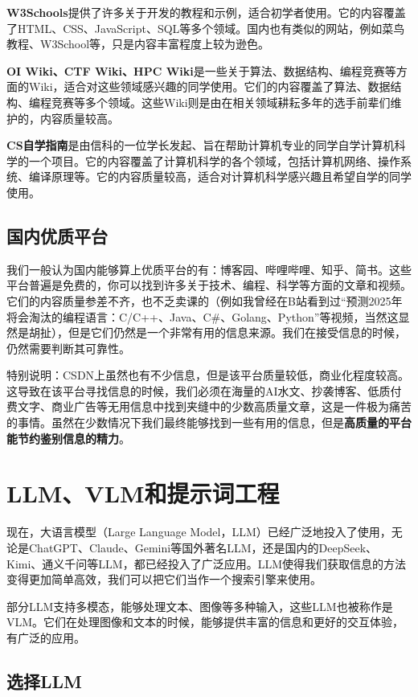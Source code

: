 \documentclass[../main.tex]{subfiles}
\begin{document}
\textbf{W3Schools}提供了许多关于开发的教程和示例，适合初学者使用。它的内容覆盖了HTML、CSS、JavaScript、SQL等多个领域。国内也有类似的网站，例如菜鸟教程、W3School等，只是内容丰富程度上较为逊色。

\textbf{OI Wiki、CTF Wiki、HPC Wiki}是一些关于算法、数据结构、编程竞赛等方面的Wiki，适合对这些领域感兴趣的同学使用。它们的内容覆盖了算法、数据结构、编程竞赛等多个领域。这些Wiki则是由在相关领域耕耘多年的选手前辈们维护的，内容质量较高。

\textbf{CS自学指南}是由信科的一位学长发起、旨在帮助计算机专业的同学自学计算机科学的一个项目。它的内容覆盖了计算机科学的各个领域，包括计算机网络、操作系统、编译原理等。它的内容质量较高，适合对计算机科学感兴趣且希望自学的同学使用。

\subsection{国内优质平台}

我们一般认为国内能够算上优质平台的有：博客园、哔哩哔哩、知乎、简书。这些平台普遍是免费的，你可以找到许多关于技术、编程、科学等方面的文章和视频。它们的内容质量参差不齐，也不乏卖课的（例如我曾经在B站看到过“预测2025年将会淘汰的编程语言：C/C++、Java、C\#、Golang、Python”等视频，当然这显然是胡扯），但是它们仍然是一个非常有用的信息来源。我们在接受信息的时候，仍然需要判断其可靠性。

特别说明：CSDN上虽然也有不少信息，但是该平台质量较低，商业化程度较高。这导致在该平台寻找信息的时候，我们必须在海量的AI水文、抄袭博客、低质付费文字、商业广告等无用信息中找到夹缝中的少数高质量文章，这是一件极为痛苦的事情。虽然在少数情况下我们最终能够找到一些有用的信息，但是\textbf{高质量的平台能节约鉴别信息的精力}。

\section{LLM、VLM和提示词工程}

现在，大语言模型（Large Language Model，LLM）已经广泛地投入了使用，无论是ChatGPT、Claude、Gemini等国外著名LLM，还是国内的DeepSeek、Kimi、通义千问等LLM，都已经投入了广泛应用。LLM使得我们获取信息的方法变得更加简单高效，我们可以把它们当作一个搜索引擎来使用。

部分LLM支持多模态，能够处理文本、图像等多种输入，这些LLM也被称作是VLM。它们在处理图像和文本的时候，能够提供丰富的信息和更好的交互体验，有广泛的应用。

\subsection{选择LLM}
\end{document}
